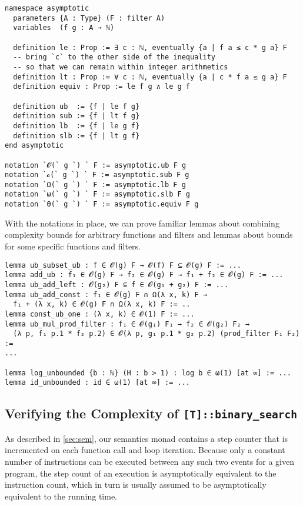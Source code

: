 \begin{verbatim}
namespace asymptotic
  parameters {A : Type} (F : filter A)
  variables  (f g : A → ℕ)

  definition le : Prop := ∃ c : ℕ, eventually {a | f a ≤ c * g a} F
  -- bring `c` to the other side of the inequality
  -- so that we can remain within integer arithmetics
  definition lt : Prop := ∀ c : ℕ, eventually {a | c * f a ≤ g a} F
  definition equiv : Prop := le f g ∧ le g f

  definition ub  := {f | le f g}
  definition sub := {f | lt f g}
  definition lb  := {f | le g f}
  definition slb := {f | lt g f}
end asymptotic

notation `𝓞(` g `) ` F := asymptotic.ub F g
notation `𝓸(` g `) ` F := asymptotic.sub F g
notation `Ω(` g `) ` F := asymptotic.lb F g
notation `ω(` g `) ` F := asymptotic.slb F g
notation `Θ(` g `) ` F := asymptotic.equiv F g
\end{verbatim}

With the notations in place, we can prove familiar lemmas about combining
complexity bounds for arbitrary functions and filters and lemmas about bounds for some
specific functions and filters.

\begin{verbatim}
lemma ub_subset_ub : f ∈ 𝓞(g) F → 𝓞(f) F ⊆ 𝓞(g) F := ...
lemma add_ub : f₁ ∈ 𝓞(g) F → f₂ ∈ 𝓞(g) F → f₁ + f₂ ∈ 𝓞(g) F := ...
lemma ub_add_left : 𝓞(g₂) F ⊆ f ∈ 𝓞(g₁ + g₂) F := ...
lemma ub_add_const : f₁ ∈ 𝓞(g) F ∩ Ω(λ x, k) F →
  f₁ + (λ x, k) ∈ 𝓞(g) F ∩ Ω(λ x, k) F := ..
lemma const_ub_one : (λ x, k) ∈ 𝓞(1) F := ...
lemma ub_mul_prod_filter : f₁ ∈ 𝓞(g₁) F₁ → f₂ ∈ 𝓞(g₂) F₂ →
  (λ p, f₁ p.1 * f₂ p.2) ∈ 𝓞(λ p, g₁ p.1 * g₂ p.2) (prod_filter F₁ F₂) :=
...

lemma log_unbounded {b : ℕ} (H : b > 1) : log b ∈ ω(1) [at ∞] := ...
lemma id_unbounded : id ∈ ω(1) [at ∞] := ...
\end{verbatim}

\subsection{Verifying the Complexity of \texttt{[T]::binary\_search}}

As described in \autoref{sec:sem}, our semantics monad contains a step counter
that is incremented on each function call and loop iteration. Because only a
constant number of instructions can be executed between any such two events for
a given program, the step count of an execution is asymptotically equivalent to the instruction
count, which in turn is usually assumed to be asymptotically equivalent to the running time.


